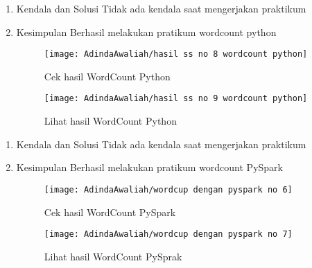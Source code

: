 \begin{enumerate}
\item Kendala dan Solusi
\newline Tidak ada kendala saat mengerjakan praktikum

\item Kesimpulan
\newline Berhasil melakukan pratikum wordcount python

\begin{figure}[!ht]
\texttt{[image: AdindaAwaliah/hasil ss no 8 wordcount python]}
\caption{Cek hasil WordCount Python}
\label{gam:hasil ss no 8 wordcount python}
\end{figure}

\begin{figure}[!ht]
\texttt{[image: AdindaAwaliah/hasil ss no 9 wordcount python]}
\caption{Lihat hasil WordCount Python}
\label{gam:hasil ss no 9 wordcount python}
\end{figure}

\end{enumerate}


\begin{enumerate}
\item Kendala dan Solusi
\newline Tidak ada kendala saat mengerjakan praktikum

\item Kesimpulan
\newline Berhasil melakukan pratikum wordcount PySpark

\begin{figure}[!ht]
\texttt{[image: AdindaAwaliah/wordcup dengan pyspark no 6]}
\caption{Cek hasil WordCount PySpark}
\label{gam:wordcup dengan pyspark no 6}
\end{figure}

\begin{figure}[!ht]
\texttt{[image: AdindaAwaliah/wordcup dengan pyspark no 7]}
\caption{Lihat hasil WordCount PySprak}
\label{gam:wordcup dengan pyspark no 7}
\end{figure}

\end{enumerate}